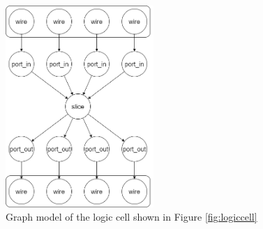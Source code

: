 \begin{figure}
\centering
\includegraphics[width=0.5\textwidth]{images/modelOfCell.png}
\caption{Graph model of the logic cell shown in Figure \ref{fig:logiccell}}
\label{fig:graphmodel-logiccell}
\end{figure}
